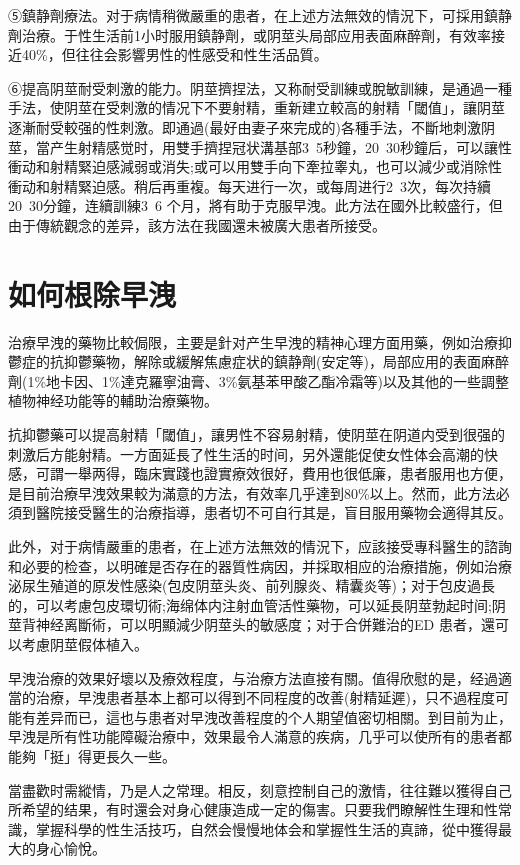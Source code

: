 \documentclass[12pt,UTF8]{ctexbook}
\begin{document}
⑤鎮静劑療法。对于病情稍微嚴重的患者，在上述方法無效的情況下，可採用鎮静劑治療。于性生活前1小时服用鎮静劑，或阴莖头局部应用表面麻醉劑，有效率接近40\%，但往往会影響男性的性感受和性生活品質。

⑥提高阴莖耐受刺激的能力。阴莖擠捏法，又称耐受訓練或脫敏訓練，是通過一種手法，使阴莖在受刺激的情况下不要射精，重新建立較高的射精「閾值」，讓阴莖逐漸耐受較强的性刺激。即通過(最好由妻子來完成的)各種手法，不斷地刺激阴莖，當产生射精感觉时，用雙手擠捏冠状溝基部3~5秒鐘，20~30秒鐘后，可以讓性衝动和射精緊迫感減弱或消失;或可以用雙手向下牽拉睾丸，也可以減少或消除性衝动和射精緊迫感。稍后再重複。每天进行一次，或每周进行2~3次，每次持續20~30分鐘，连續訓練3~6 个月，將有助于克服早洩。此方法在國外比較盛行，但由于傳統觀念的差异，該方法在我國還未被廣大患者所接受。

\section{如何根除早洩}

治療早洩的藥物比較侷限，主要是針对产生早洩的精神心理方面用藥，例如治療抑鬱症的抗抑鬱藥物，解除或緩解焦慮症状的鎮静劑(安定等)，局部应用的表面麻醉劑(1\%地卡因、1\%達克羅寧油膏、3\%氨基苯甲酸乙酯冷霜等)以及其他的一些調整植物神经功能等的輔助治療藥物。

抗抑鬱藥可以提高射精「閾值」，讓男性不容易射精，使阴莖在阴道内受到很强的刺激后方能射精。一方面延長了性生活的时间，另外還能促使女性体会高潮的快感，可謂一舉两得，臨床實踐也證實療效很好，費用也很低廉，患者服用也方便，是目前治療早洩效果較为滿意的方法，有效率几乎達到80\%以上。然而，此方法必須到醫院接受醫生的治療指導，患者切不可自行其是，盲目服用藥物会適得其反。

此外，对于病情嚴重的患者，在上述方法無效的情況下，应該接受專科醫生的諮詢和必要的检查，以明確是否存在的器質性病因，并採取相应的治療措施，例如治療泌尿生殖道的原发性感染(包皮阴莖头炎、前列腺炎、精囊炎等)；对于包皮過長的，可以考慮包皮環切術;海绵体内注射血管活性藥物，可以延長阴莖勃起时间;阴莖背神经离斷術，可以明顯減少阴莖头的敏感度；对于合併難治的ED 患者，還可以考慮阴莖假体植入。

早洩治療的效果好壞以及療效程度，与治療方法直接有關。值得欣慰的是，经過適當的治療，早洩患者基本上都可以得到不同程度的改善(射精延遲)，只不過程度可能有差异而已，這也与患者对早洩改善程度的个人期望值密切相關。到目前为止，早洩是所有性功能障礙治療中，效果最令人滿意的疾病，几乎可以使所有的患者都能夠「挺」得更長久一些。

當盡歡时需縱情，乃是人之常理。相反，刻意控制自己的激情，往往難以獲得自己所希望的结果，有时還会对身心健康造成一定的傷害。只要我們瞭解性生理和性常識，掌握科學的性生活技巧，自然会慢慢地体会和掌握性生活的真諦，從中獲得最大的身心愉悅。
\end{document}
